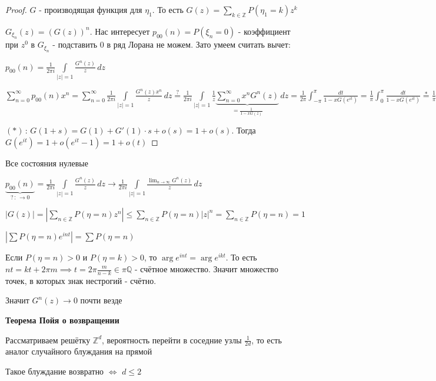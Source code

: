 \begin{proof}
    $G$ - производящая функция для $\eta_1$. То есть $G(z) = \sum\limits_{k \in \mathbb{Z}} P(\eta_1 = k) z^k$

    $G_{\xi_n} (z) = (G(z))^n$. Нас интересует $p_{00} (n) = P(\xi_n = 0)$ - коэффициент при $z^0$ в $G_{\xi_n}$ - подставить 0 в ряд Лорана не можем. Зато умеем считать вычет:

    $p_{00} (n) = \frac{1}{2\pi i} \int\limits_{|z| = 1} \frac{G^n (z)}{z} \, dz$

    $\sum\limits_{n=0}^\infty p_{00} (n)x^n = \sum\limits_{n = 0}^\infty \frac{1}{2\pi i} \int\limits_{|z| = 1} \frac{G^n (z) x^n}{z} \, dz \overset{?}{=} \frac{1}{2\pi i} \int\limits_{|z| = 1} \frac{1}{z} \underbrace{\sum\limits_{n = 0}^\infty x^n G^n (z)}_{= \frac{1}{1 - xG(z)}} \, dz = 
    \frac{1}{2\pi} \int_{-\pi}^\pi \frac{dt}{1 - xG(e^{it})} = \frac{1}{\pi} \int_0^\pi \frac{dt}{1 - xG(e^{it})} \overset{{*}}{=} \frac{1}{\pi} \int_0^\pi \frac{dt}{1 - x + o(xt)} \geqslant \frac{1}{\pi} \int_0^\pi \frac{dt}{1 - x + xt} = \frac{1}{\pi} \frac{\ln (1 - x + xt)}{x} \bigg |_{t=0}^{t = \pi} \rightarrow +\infty$

    $(*) \, : \, G(1 + s) = G(1) + G' (1) \cdot s + o(s) = 1 + o(s)$. Тогда $G(e^{it}) = 1 + o(e^{it} - 1) = 1 + o(t)$
\end{proof}

\begin{remark}
    Все состояния нулевые

    $\underbrace{p_{00} (n)}_{? \, : \, \rightarrow 0} = \frac{1}{2\pi i} \int\limits_{|z| = 1} \frac{G^n (z)}{z} \, dz \rightarrow \frac{1}{2\pi i} \int\limits_{|z| = 1} \frac{\lim_{n\to \infty} G^n (z)}{z} \, dz$

    $\left| G(z) \right| = \left| \sum\limits_{n \in \mathbb{Z}} P(\eta = n) z^n \right| \leqslant \sum\limits_{n \in \mathbb{Z}} P(\eta = n) |z|^n = \sum\limits_{n \in \mathbb{Z}} P(\eta = n) = 1$

    $\left| \sum P(\eta = n) e^{int} \right| = \sum P(\eta = n)$

    Если $P(\eta = n) > 0$ и $P(\eta = k) > 0$, то $\arg e^{int} = \arg e^{ikt}$. То есть $nt = kt + 2\pi m \implies t = 2\pi \frac{m}{n - k} \in \pi \mathbb{Q}$ - счётное множество. Значит множество точек, в которых знак нестрогий - счётно.

    Значит $G^n (z) \rightarrow 0$ почти везде
\end{remark}

\begin{theorem}
    \textbf{Теорема Пойя о возвращении}

    Рассматриваем решётку $\mathbb{Z}^d$, вероятность перейти в соседние узлы $\frac{1}{2d}$, то есть аналог случайного блуждания на прямой

    Такое блуждание возвратно $\Longleftrightarrow$ $d \leqslant 2$
\end{theorem}

